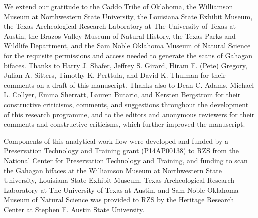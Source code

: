 \documentclass[review]{elsarticle}
\begin{document}
We extend our gratitude to the Caddo Tribe of Oklahoma, the Williamson Museum at Northwestern State University, the Louisiana State Exhibit Museum, the Texas Archeological Research Laboratory at The University of Texas at Austin, the Brazos Valley Museum of Natural History, the Texas Parks and Wildlife Department, and the Sam Noble Oklahoma Museum of Natural Science for the requisite permissions and access needed to generate the scans of Gahagan bifaces. Thanks to Harry J. Shafer, Jeffrey S. Girard, Hiram F. (Pete) Gregory, Julian A. Sitters, Timothy K. Perttula, and David K. Thulman for their comments on a draft of this manuscript. Thanks also to Dean C. Adams, Michael L. Collyer, Emma Sherratt, Lauren Butaric, and Kersten Bergstrom for their constructive criticisms, comments, and suggestions throughout the development of this research programme, and to the editors and anonymous reviewers for their comments and constructive criticisms, which further improved the manuscript.

Components of this analytical work flow were developed and funded by a Preservation Technology and Training grant (P14AP00138) to RZS from the National Center for Preservation Technology and Training, and funding to scan the Gahagan bifaces at the Williamson Museum at Northwestern State University, Louisiana State Exhibit Museum, Texas Archeological Research Laboratory at The University of Texas at Austin, and Sam Noble Oklahoma Museum of Natural Science was provided to RZS by the Heritage Research Center at Stephen F. Austin State University.


\end{document}
